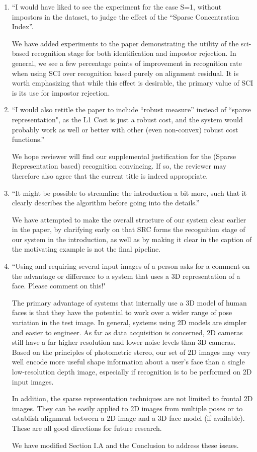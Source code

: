 \documentclass[11pt]{article}
\begin{document}
\begin{enumerate}
\item ``I would have liked to see the experiment for the case S=1, without
impostors in the dataset, to judge the effect of the ``Sparse
Concentration Index''.

We have added experiments to the paper demonstrating the utility of the
sci-based recognition stage for both identification and impostor rejection.  In
general, we see a few percentage points of improvement in recognition rate when
using SCI over recognition based purely on alignment residual.  
It is worth emphasizing that while this effect is desirable, 
the primary value of SCI is its use for impostor rejection. 

\item ``I would also retitle the paper to include ``robust measure''
instead of ``sparse representation", as the L1 Cost is just a robust
cost, and the system would probably work as well or better with other
(even non-convex) robust cost functions.''

We hope reviewer will find our supplemental justification for the (Sparse
Representation based) recognition convincing.  If so, the reviewer may
therefore also agree that the current title is indeed appropriate.

\item ``It might be possible to streamline the introduction a bit more, such that it
clearly describes the algorithm before going into the details.''

We have attempted to make the overall structure of our system clear earlier in the
paper, by clarifying early on that SRC forms the recognition stage of our system
in the introduction, as well as by making it clear in the caption of the motivating example
is not the final pipeline.

\item ``Using and requiring several input images of a person asks for a
comment on the advantage or difference to a system that uses
a 3D representation of a face. Please comment on this!"

The primary advantage of systems that internally use a 3D model of human faces
is that they have the potential to work over a wider range of pose variation in
the test image.  In general, systems using 2D models are simpler and easier to
engineer.  As far as data acquisition is concerned, 2D cameras still have a far
higher resolution and lower noise levels than 3D cameras.  Based on the principles
of photometric stereo, our set of 2D images may very well encode more useful shape 
information about a user's face than a single low-resolution depth image, especially if 
recognition is to be performed on 2D input images.

In addition, the sparse representation techniques are not limited to frontal 2D images.
They can be easily applied to 2D images from multiple poses or to establish alignment
between a 2D image and a 3D face model (if available). These are all good directions
for future research. 

We have modified Section I.A and the Conclusion to address these issues.

\end{enumerate}
\end{document}
